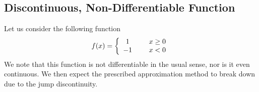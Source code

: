 \documentclass{article}
\begin{document}
\subsection{Discontinuous, Non-Differentiable Function}
Let us consider the following function
\begin{align*}
	f(x) = \left\{ \begin{array}{cc} 
                1 & \hspace{5mm} x \ge 0 \\
                -1 & \hspace{5mm} x < 0 
                \end{array} \right.
\end{align*}
We note that this function is not differentiable in the usual sense, nor is it even continuous. We then expect the prescribed approximation method to break down due to the jump discontinuity. 
\end{document}
